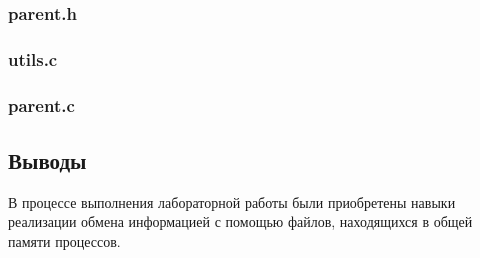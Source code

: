 \documentclass[12pt]{article}
\begin{document}
	\subsubsection*{parent.h}
	
	
	
	\subsubsection{utils.c}
	
	
	
	\subsubsection*{parent.c}
	
	
	
	\subsection*{Выводы}
	
	В процессе выполнения лабораторной работы были приобретены навыки реализации обмена информацией с помощью файлов, находящихся в общей памяти процессов.
	
\end{document}
